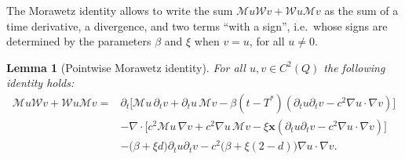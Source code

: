 \documentclass[a4paper]{article}
\theoremstyle{plain}
\newtheorem{lemma}[theorem]{Lemma}
\theoremstyle{definition}
\newcommand{\operator}[1]{\mathcal{#1}}
\newcommand{\Div}[1]{\nabla \cdot #1}
\newcommand{\Grad}[1]{\nabla #1}
\newcommand{\TimeDer}{{\partial^{}_t}}
\newcommand{\vect}[1]{\bm{#1}}
\begin{document}
The Morawetz identity allows to write the sum $\operator{M}u \operator{W}v +  \operator{W}u\operator{M}v$ as the sum of a time derivative, a divergence, and two terms ``with a sign'', i.e.\ whose signs are determined by the parameters $\beta$ and $\xi$ when $v=u$, for all $u\ne0$.
\begin{lemma}[Pointwise Morawetz identity]
	For all $u,v\in C^2(Q)$ the following identity holds:
	\begin{equation}
		\label{eq:diff_identity}
		\begin{split}
			\operator{M}u \operator{W}v + \operator{W}u\operator{M}v
=&\TimeDer{} \Big[
				\operator{M}u \, \TimeDer{v} +\TimeDer{u} \,\operator{M}v
				-\beta (t-T^*)\left(\TimeDer{u} \TimeDer{v} - c^2\Grad u \cdot \Grad v\right)
				\Big] \\
&-\Div \Big[
			c^2{\operator{M}u\, \Grad v} + c^2\Grad u\,\operator{M}v
			- \xi \vect{x} \left( \TimeDer{u}\TimeDer{v} - c^2\Grad u \cdot \Grad v \right)
			\Big] \\
& - \big(\beta + \xi d \big) \TimeDer{u} \TimeDer{v}
-c^2 \big(
			\beta + \xi (2 - d)
			\big) \Grad u \cdot \Grad v.
		\end{split}
	\end{equation}
\end{lemma}
\end{document}
